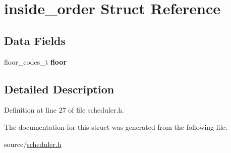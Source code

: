 \hypertarget{structinside__order}{}\section{inside\+\_\+order Struct Reference}
\label{structinside__order}
\subsection*{Data Fields}
\begin{DoxyCompactItemize}
\item 
floor\+\_\+codes\+\_\+t {\bfseries floor}\hypertarget{structinside__order_a5f816e91e84a8bd27ac2a179c43691dc}{}\label{structinside__order_a5f816e91e84a8bd27ac2a179c43691dc}

\end{DoxyCompactItemize}


\subsection{Detailed Description}


Definition at line 27 of file scheduler.\+h.



The documentation for this struct was generated from the following file\+:\begin{DoxyCompactItemize}
\item 
source/\hyperlink{scheduler_8h}{scheduler.\+h}\end{DoxyCompactItemize}
